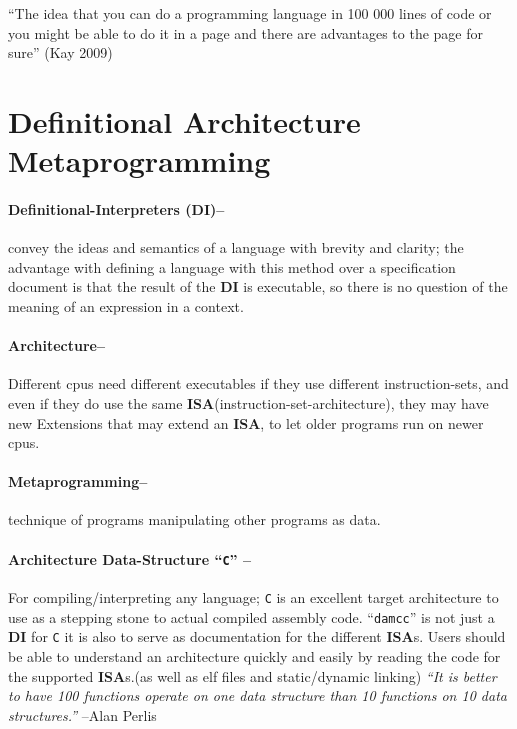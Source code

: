 ``The idea that you can do a programming language in 100 000 lines of
code or you might be able to do it in a page and there are advantages to
the page for sure'' (Kay 2009)

\hypertarget{definitional-architecture-metaprogramming}{%
\section{Definitional Architecture
Metaprogramming}\label{definitional-architecture-metaprogramming}}

\hypertarget{definitional-interpreters-di}{%
\paragraph{Definitional-Interpreters
(DI)--}\label{definitional-interpreters-di}}

convey the ideas and semantics of a language with brevity and clarity;
the advantage with defining a language with this method over a
specification document is that the result of the \textbf{DI} is
executable, so there is no question of the meaning of an expression in a
context.

\hypertarget{architecture}{%
\paragraph{Architecture--}\label{architecture}}

Different cpus need different executables if they use different
instruction-sets, and even if they do use the same
\textbf{ISA}(instruction-set-architecture), they may have new Extensions
that may extend an \textbf{ISA}, to let older programs run on newer
cpus.

\hypertarget{metaprogramming}{%
\paragraph{Metaprogramming--}\label{metaprogramming}}

technique of programs manipulating other programs as data.

\hypertarget{architecture-data-structure-c}{%
\paragraph{\texorpdfstring{Architecture Data-Structure ``\texttt{C}''
--}{Architecture Data-Structure ``C'' --}}\label{architecture-data-structure-c}}

For compiling/interpreting any language; \texttt{C} is an excellent
target architecture to use as a stepping stone to actual compiled
assembly code. ``\texttt{damcc}'' is not just a \textbf{DI} for
\texttt{C} it is also to serve as documentation for the different
\textbf{ISA}s. Users should be able to understand an architecture
quickly and easily by reading the code for the supported
\textbf{ISA}s.(as well as elf files and static/dynamic linking)
\emph{``It is better to have 100 functions operate on one data structure
than 10 functions on 10 data structures.''} --Alan Perlis


